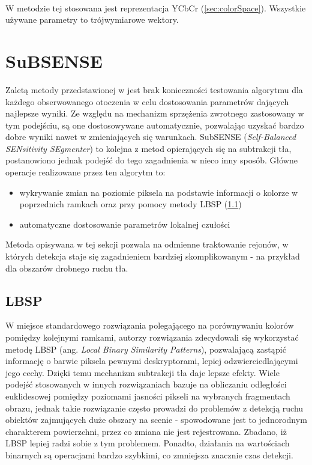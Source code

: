 \paragraph{}
W metodzie tej stosowana jest reprezentacja YCbCr (\ref{sec:colorSpace}). Wszystkie używane parametry to trójwymiarowe wektory.

\section{SuBSENSE}
Zaletą metody przedstawionej w \cite{stflexible} jest brak konieczności testowania algorytmu dla każdego obserwowanego otoczenia w celu dostosowania parametrów dających najlepsze wyniki. Ze względu na mechanizm sprzężenia zwrotnego zastosowany w tym podejściu, są one dostosowywane automatycznie, pozwalając uzyskać bardzo dobre wyniki nawet w zmieniających się warunkach. SubSENSE (\textit{Self-Balanced SENsitivity SEgmenter}) to kolejna z metod opierających się na subtrakcji tła, postanowiono jednak podejść do tego zagadnienia w nieco inny sposób. Główne operacje realizowane przez ten algorytm to:
\begin{itemize}
\item wykrywanie zmian na poziomie piksela na podstawie informacji o kolorze w poprzednich ramkach oraz przy pomocy metody LBSP (\ref{sec:LBSP})
\item automatyczne dostosowanie parametrów lokalnej czułości
\end{itemize}
Metoda opisywana w tej sekcji pozwala na odmienne traktowanie rejonów, w których detekcja staje się zagadnieniem bardziej skomplikowanym - na przykład dla obszarów drobnego ruchu tła. 
\subsection{LBSP}
\label{sec:LBSP}
W miejsce standardowego rozwiązania polegającego na porównywaniu kolorów pomiędzy kolejnymi ramkami, autorzy rozwiązania zdecydowali się wykorzystać metodę LBSP \cite{bilodeau2013change} (ang. \textit{Local Binary Similarity Patterns}), pozwalającą zastąpić informację o barwie piksela pewnymi deskryptorami, lepiej odzwierciedlającymi jego cechy. Dzięki temu mechanizm subtrakcji tła daje lepsze efekty. Wiele podejść stosowanych w innych rozwiązaniach bazuje na obliczaniu odległości euklidesowej pomiędzy poziomami jasności pikseli na wybranych fragmentach obrazu, jednak takie rozwiązanie często prowadzi do problemów z detekcją ruchu obiektów zajmujących duże obszary na scenie - spowodowane jest to jednorodnym charakterem powierzchni, przez co zmiana nie jest rejestrowana. Zbadano, iż LBSP lepiej radzi sobie z tym problemem. Ponadto, działania na wartościach binarnych są operacjami bardzo szybkimi, co zmniejsza znacznie czas detekcji.
